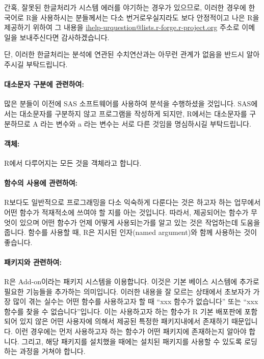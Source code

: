 간혹, 잘못된 한글처리가 시스템 에러를 야기하는 경우가 있으므로, 이러한 경우에 한국어로 R을 사용하시는 분들께서는 다소 번거로우실지라도 보다 안정적이고 나은 R을 제공하기 위하여 그 내용을 \href{mailto:ihelp-urquestion@lists.r-forge.r-project.org}{ihelp-urquestion@lists.r-forge.r-project.org} 주소로 이메일을 보내주신다면 감사하겠습니다. 

단, 이러한 한글처리는 분석에 연관된 수치연산과는 아무런 관계가 없음을 반드시 알아주시길 부탁드립니다.
%

\paragraph{대소문자 구분에 관련하여:}  많은 분들이 이전에 SAS 소프트웨어를 사용하여 분석을 수행하셨을 것입니다.
SAS에서는 대소문자를 구분하지 않고 프로그램을 작성하게 되지만, R에서는 대소문자를 구분하므로 A 라는 변수와 a 라는 변수는 서로 다른 것임을 명심하시길 부탁드립니다. 
%

\paragraph{객체:}  R에서 다루어지는 모든 것을 객체라고 합니다.

\paragraph{함수의 사용에 관련하여:}
R보다도 일반적으로 프로그래밍을 다소 익숙하게 다룬다는 것은 하고자 하는 업무에서 어떤 함수가 적재적소에 쓰여야 할 지를 아는 것입니다. 
	따라서, 제공되어는 함수가 무엇이 있으며 어떤 함수가 언제 어떻게 사용되는가를 알고 있는 것은 작업하는데 도움을 줍니다. 
	함수를 사용할 때,  R은 지시된 인자(named argument)와 함께 사용하는 것이 좋습니다.  

\paragraph{패키지와 관련하여:}
R은 Add-on이라는 패키지 시스템을 이용합니다. 
이것은 기본 베이스 시스템에 추가로 필요한 기능들을 추가하는 의미입니다.
이러한 내용을 잘 모르는 상태에서 초보자가 가장 많이 겪는 실수는 어떤 함수를 사용하고자 할 때 ``xxx 함수가 없습니다'' 또는 ``xxx 함수를 찾을 수 없습니다''입니다.
이는 사용하고자 하는 함수가 R 기본 배포판에 포함되어 있지 않은 어떤 사용자에 의해서 제공된 특정한 패키지내에서 존재하기 때문입니다.
이런 경우에는 먼저 사용하고자 하는 함수가 어떤 패키지에 존재하는지 알아야 합니다.  
그리고, 해당 패키지를 설치했을 때에는 설치된 패키지를 사용할 수 있도록 로딩하는 과정을 거쳐야 합니다.

